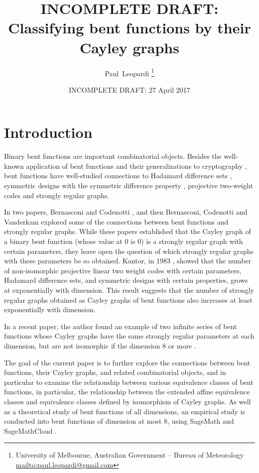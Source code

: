 \documentclass[12pt,a4paper]{article}
\title{INCOMPLETE DRAFT: \\
Classifying bent functions by their Cayley graphs}
\author{
Paul~Leopardi
\thanks{University of Melbourne, Australian Government -- Bureau of Meteorology
\protect\url{mailto:paul.leopardi@gmail.com}}
}
\date{INCOMPLETE DRAFT: 27 April 2017}
\begin{document}
\maketitle

\begin{abstract}
%
%
\end{abstract}

\section{Introduction}
\label{sec-Introduction}
Binary bent functions are important combinatorial objects.
Besides the well-known application of bent functions and their generalizations to cryptography
\cite{Ada97} \cite[4.1-4.6]{Tok15bent},
bent functions have well-studied connections to Hadamard difference sets \cite{Dil74},
symmetric designs with the symmetric difference property \cite{DilS87block,Kan75symplectic},
projective two-weight codes \cite{DinD15class} and strongly regular graphs.

In two papers, Bernasconi and Codenotti \cite{BerC99}, and then Bernasconi, Codenotti and Vanderkam
\cite{BerCV01} explored some of the connections
between bent functions and strongly regular graphs.
While these papers established that the Cayley graph of a binary bent function (whose value at 0 is
0) is a strongly regular graph
with certain parameters, they leave open the question of which strongly regular graphs with these
parameters  be so obtained.
Kantor, in 1983 \cite{Kan83exponential}, showed that the number of non-isomorphic projective linear
two weight codes with certain parameters,
Hadamard difference sets, and symmetric designs with certain properties, grows at exponentially
with dimension.
This result suggests that the number of strongly regular graphs obtained as Cayley graphs of bent
functions also increases at least exponentially with dimension.

In a recent paper, the author found an example of two infinite series of bent functions whose
Cayley graphs have the same strongly regular parameters at each dimension,
but are not isomorphic if the dimension 8 or more \cite{Leo17Hurwitz}.

The goal of the current paper is to further explore the connections between bent functions, their
Cayley graphs, and related combinatorial objects,
and in particular to examine the relationship between various equivalence classes of bent
functions, in particular, the relationship between the extended affine
equivalence classes and equivalence classes defined by isomorphism of Cayley graphs.
As well as a theoretical study of bent functions of all dimensions, an empirical study is conducted
into bent functions of dimension at most 8,
using SageMath \cite{SageMath7517} and SageMathCloud \cite{SageMathCloud}.
\end{document}
